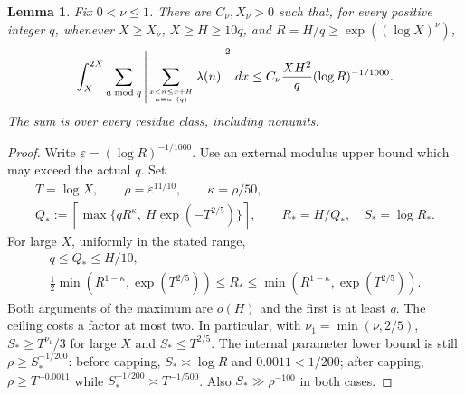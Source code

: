 \documentclass[11pt]{article}
\newtheorem{lemma}[theorem]{Lemma}
\theoremstyle{definition}
\newcommand{\abs}[1]{\left\lvert#1\right\rvert}
\begin{document}
\begin{lemma}\label{lem:variance}
Fix $0<\nu\le1$. There are $C_\nu,X_\nu>0$ such that, for every
positive integer $q$, whenever $X\ge X_\nu$, $X\ge H\ge10q$, and
$R=H/q\ge\exp((\log X)^\nu)$,
\begin{equation}\label{eq:variance}
 \int_X^{2X}\sum_{a\bmod q}
   \abs{\sum_{x<n\le x+H\atop n\equiv a\ (q)}\lambda(n)}^2\,dx
 \le C_\nu\frac{XH^2}{q}(\log R)^{-1/1000}.
\end{equation}
The sum is over every residue class, including nonunits.
\end{lemma}
\begin{proof}
Write $\varepsilon=(\log R)^{-1/1000}$.
Use an external modulus upper bound which may exceed the actual $q$.
Set
\begin{gather*}
 T=\log X,\qquad \rho=\varepsilon^{11/10},\qquad \kappa=\rho/50,\\
 Q_*:=\left\lceil\max\{qR^\kappa,\ H\exp(-T^{2/5})\}\right\rceil,
 \qquad R_*=H/Q_*,\quad S_*=\log R_*.
\end{gather*}
For large $X$, uniformly in the stated range,
\begin{equation}\label{eq:kmtcap}
 \begin{gathered}
 q\le Q_*\le H/10,\\
 \tfrac12\min(R^{1-\kappa},\exp(T^{2/5}))
       \le R_*\le\min(R^{1-\kappa},\exp(T^{2/5})).
 \end{gathered}
\end{equation}
Both arguments of the maximum are $o(H)$ and the first is at least $q$.
The ceiling costs a factor at most two.
In particular, with $\nu_1=\min(\nu,2/5)$,
$S_*\ge T^{\nu_1}/3$ for large $X$ and $S_*\le T^{2/5}$.
The internal parameter lower bound is still
$\rho\ge S_*^{-1/200}$: before capping,
$S_*\asymp\log R$ and $0.0011<1/200$; after capping,
$\rho\ge T^{-0.0011}$ while $S_*^{-1/200}\asymp T^{-1/500}$.
Also $S_*\gg\rho^{-100}$ in both cases.


\end{proof}
\end{document}
